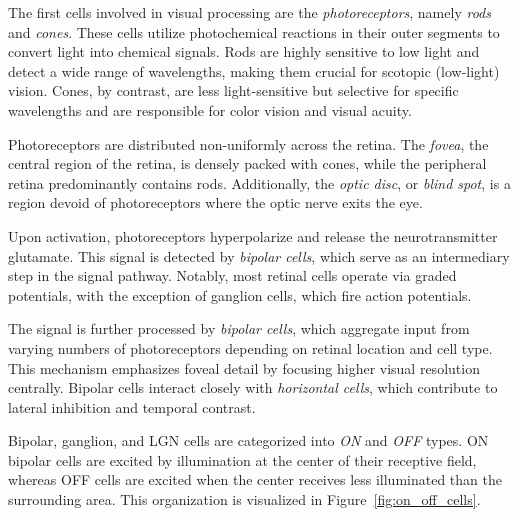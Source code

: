 The first cells involved in visual processing are the \emph{photoreceptors}, namely \emph{rods} and \emph{cones}. These cells utilize photochemical reactions in their outer segments to convert light into chemical signals. Rods are highly sensitive to low light and detect a wide range of wavelengths, making them crucial for scotopic (low-light) vision. Cones, by contrast, are less light-sensitive but selective for specific wavelengths and are responsible for color vision and visual acuity.

Photoreceptors are distributed non-uniformly across the retina. The \emph{fovea}, the central region of the retina, is densely packed with cones, while the peripheral retina predominantly contains rods. Additionally, the \emph{optic disc}, or \emph{blind spot}, is a region devoid of photoreceptors where the optic nerve exits the eye.

Upon activation, photoreceptors hyperpolarize and release the neurotransmitter glutamate. This signal is detected by \emph{bipolar cells}, which serve as an intermediary step in the signal pathway. Notably, most retinal cells operate via graded potentials, with the exception of ganglion cells, which fire action potentials.

The signal is further processed by \emph{bipolar cells}, which aggregate input from varying numbers of photoreceptors depending on retinal location and cell type. This mechanism emphasizes foveal detail by focusing higher visual resolution centrally. Bipolar cells interact closely with \emph{horizontal cells}, which contribute to lateral inhibition and temporal contrast.

Bipolar, ganglion, and LGN cells are categorized into \emph{ON} and \emph{OFF} types. ON bipolar cells are excited by illumination at the center of their receptive field, whereas OFF cells are excited when the center receives less illuminated than the surrounding area. This organization is visualized in Figure~\ref{fig:on_off_cells}.

